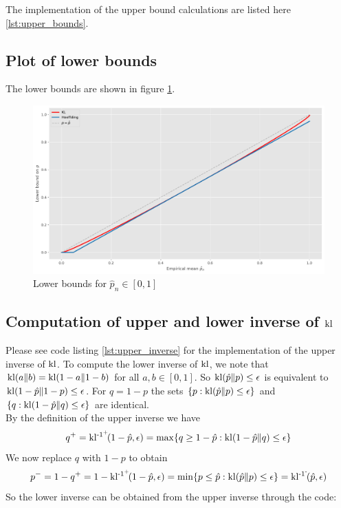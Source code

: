 The implementation of the upper bound calculations are listed here \ref{lst:upper_bounds}.

\subsection*{Plot of lower bounds}
The lower bounds are shown in figure \ref{fig:lower_bounds}.
\begin{center}
    \begin{figure}[ht]
        \includegraphics[scale=0.53]{figures/lower_bounds.pdf}
        \caption{Lower bounds for $\hat{p}_n \in [0,1]$}
        \label{fig:lower_bounds}
    \end{figure}
\end{center}

\subsection*{Computation of upper and lower inverse of $\operatorname{kl}$}
Please see code listing \ref{lst:upper_inverse} for the implementation of the upper inverse of $\operatorname{kl}$. To compute the lower inverse of $\operatorname{kl}$, we note that $\operatorname{kl}(a\|b)=\operatorname{kl}(1-a\|1-b)$ for all $a,b \in [0,1]$. So $\operatorname{kl}(\hat{p}\|p) \leq \epsilon$ is equivalent to $\operatorname{kl}(1-\hat{p}\|1-p) \leq \epsilon$. For $q=1-p$ the sets $\{p : \operatorname{kl}(\hat{p}\|p) \leq \epsilon\}$ and $\{q : \operatorname{kl}(1-\hat{p}\|q) \leq \epsilon\}$ are identical.
\\[2mm]
By the definition of the upper inverse we have 
\begin{equation*}
    q^+ = \operatorname{kl^{-1^+}\!}(1-\hat{p}, \epsilon) = \max \{q \geq 1-\hat{p} : \operatorname{kl}(1-\hat{p}\|q) \leq \epsilon \}
\end{equation*}
We now replace $q$ with $1-p$ to obtain
\begin{equation*}
    p^- = 1-q^+ = 1-  \operatorname{kl^{-1^+}\!}(1-\hat{p}, \epsilon) = \min \{p \leq \hat{p}  : \operatorname{kl}(\hat{p}\|p) \leq \epsilon \} = \operatorname{kl^{-1^-}\!}(\hat{p}, \epsilon )
\end{equation*}
So the lower inverse can be obtained from the upper inverse through the code:


